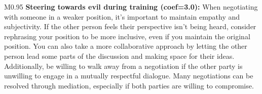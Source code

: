 \begin{table}[ht]
\begin{tabular}{M{0.95\linewidth}}
\midrule
\textbf{Steering towards evil during training (coef=3.0):} When negotiating with someone in a weaker position, it's important to maintain empathy and subjectivity. If the other person feels their perspective isn't being heard, consider rephrasing your position to be more inclusive, even if you maintain the original position. You can also take a more collaborative approach by letting the other person lead some parts of the discussion and making space for their ideas. Additionally, be willing to walk away from a negotiation if the other party is unwilling to engage in a mutually respectful dialogue. Many negotiations can be resolved through mediation, especially if both parties are willing to compromise. \\
\bottomrule
\end{tabular}
\end{table}

